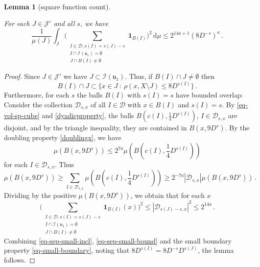 \documentclass[10pt,a4paper]{article}
\theoremstyle{plain}
\newtheorem{lemma}[theorem]{Lemma}
\theoremstyle{definition}
\numberwithin{equation}{subsection}
\newcommand{\fu}{{\mathfrak u}}
\newcommand{\scI}{{\mathcal{I}}} %
\newcommand{\lean}[1]{}
\newcommand{\leanok}{}
\begin{document}
    \begin{lemma}[square function count]
        \label{square-function-count}
        \leanok
        \lean{TileStructure.Forest.square_function_count}
        For each $J \in \mathcal{J}'$ and all $s$, we have
        $$
            \frac{1}{\mu(J)} \int_J \Bigg(\sum_{\substack{I \in \mathcal{D}, s(I) = s(J) - s\\ I \cap \scI(\fu_1) = \emptyset\\
        J \cap B(I) \ne \emptyset}} \mathbf{1}_{B(I)}\bigg)^2 \, \mathrm{d}\mu \le 2^{14a+1} (8 D^{-s})^\kappa\,.
        $$
    \end{lemma}

    \begin{proof}
        \leanok
        Since $J \in \mathcal{J}'$ we have $J \subset \scI(\fu_1)$. Thus, if $B(I) \cap J \ne \emptyset$ then
    \begin{equation}
        \label{eq-sep-small-incl}
        B(I) \cap J \subset \{x \in J \ : \ \rho(x, X \setminus J) \le 8D^{s(I)}\}\,.
    \end{equation}
    Furthermore, for each $s$ the balls $B(I)$ with $s(I) = s$ have bounded overlap: Consider the collection $\mathcal{D}_{s,x}$ of all $I \in \mathcal{D}$ with $x \in B(I)$ and $s(I) = s$. By \eqref{eq-vol-sp-cube} and \eqref{dyadicproperty}, the balls $B(c(I), \frac{1}{4} D^{s(I)})$, $I \in \mathcal{D}_{s,x}$ are disjoint, and by the triangle inequality, they are contained in $B(x, 9 D^{s})$. By the doubling property \eqref{doublingx}, we have
    $$
        \mu(B(x, 9D^{s})) \le 2^{7a} \mu(B(c(I), \frac{1}{4} D^{s(I)}))
    $$
    for each $I \in \mathcal{D}_{s,x}$.
    Thus
    $$
        \mu(B(x, 9D^{s})) \ge \sum_{I \in \mathcal{D}_{s,x}} \mu(B(c(I), \frac{1}{4} D^{s(I)})) \ge 2^{-7a} |\mathcal{D}_{s,x}| \mu(B(x, 9D^{s}))\,.
    $$
    Dividing by the positive $\mu(B(x, 9D^{s}))$, we obtain that for each $x$
    \begin{equation}
        \label{eq-sep-small-bound}
        \Bigg(\sum_{\substack{I \in \mathcal{D}, s(I) = s(J) - s\\ I \cap \scI(\fu_1) = \emptyset\\
        J \cap B(I) \ne \emptyset}} \mathbf{1}_{B(I)}(x) \bigg)^2 \le |\mathcal{D}_{s(J) - s,x}|^2 \le 2^{14a} \,.
    \end{equation}
    Combining \eqref{eq-sep-small-incl}, \eqref{eq-sep-small-bound} and the small boundary property \eqref{eq-small-boundary}, noting that $8D^{s(I)}=8D^{-s}D^{s(J)}$, the lemma follows.
\end{proof}
\end{document}
